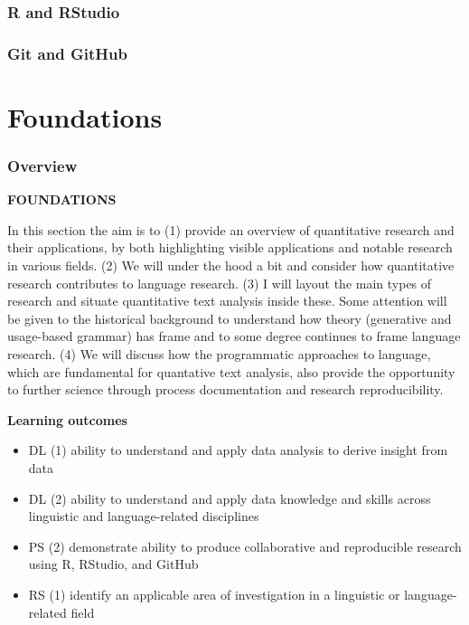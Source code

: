 \documentclass[
]{article}
\providecommand{\tightlist}{%
  \setlength{\itemsep}{0pt}\setlength{\parskip}{0pt}}
\begin{document}
\hypertarget{r-and-rstudio}{%
\section*{R and RStudio}\label{r-and-rstudio}}

\hypertarget{git-and-github}{%
\section*{Git and GitHub}\label{git-and-github}}

\citep{Bryan2017a}

\hypertarget{part-foundations}{%
\part{Foundations}\label{part-foundations}}

\hypertarget{foundations-overview}{%
\section*{Overview}\label{foundations-overview}}

\textbf{FOUNDATIONS}

In this section the aim is to (1) provide an overview of quantitative research and their applications, by both highlighting visible applications and notable research in various fields. (2) We will under the hood a bit and consider how quantitative research contributes to language research. (3) I will layout the main types of research and situate quantitative text analysis inside these. Some attention will be given to the historical background to understand how theory (generative and usage-based grammar) has frame and to some degree continues to frame language research. (4) We will discuss how the programmatic approaches to language, which are fundamental for quantative text analysis, also provide the opportunity to further science through process documentation and research reproducibility.

\textbf{Learning outcomes}

\begin{itemize}
\tightlist
\item
  DL (1) ability to understand and apply data analysis to derive insight from data
\item
  DL (2) ability to understand and apply data knowledge and skills across linguistic and language-related disciplines
\item
  PS (2) demonstrate ability to produce collaborative and reproducible research using R, RStudio, and GitHub
\item
  RS (1) identify an applicable area of investigation in a linguistic or language-related field
\end{itemize}
\end{document}

